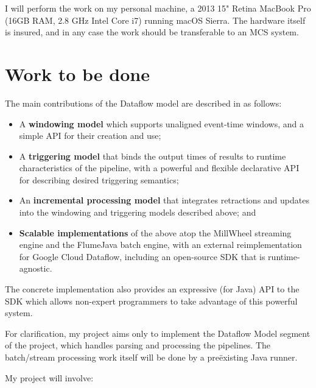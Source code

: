 \documentclass[11pt]{scrartcl}
\begin{document}
I will perform the work on my personal machine, a 2013 15" Retina MacBook Pro (16GB RAM, 2.8 GHz Intel Core i7) running macOS Sierra. The hardware itself is insured, and in any case the work should be transferable to an MCS system.

\section*{Work to be done}

The main contributions of the Dataflow model are described in \cite{Akidau:2015} as follows:

\begin{itemize}
	\item A \textbf{windowing model} which supports unaligned event-time windows, and a simple API for their creation and use;
	\item A \textbf{triggering model} that binds the output times of results to runtime characteristics of the pipeline, with a powerful and flexible declarative API for describing desired triggering semantics;
	\item An \textbf{incremental processing model} that integrates retractions and updates into the windowing and triggering models described above; and
	\item \textbf{Scalable implementations} of the above atop the MillWheel streaming engine and the FlumeJava batch engine, with an external reimplementation for Google Cloud Dataflow, including an open-source SDK that is runtime-agnostic.
\end{itemize}

The concrete implementation also provides an expressive (for Java) API to the SDK which allows non-expert programmers to take advantage of this powerful system.

For clarification, my project aims only to implement the Dataflow Model segment of the project, which handles parsing and processing the pipelines. The batch/stream processing work itself will be done by a pre\"existing Java runner.

My project will involve:
\end{document}
